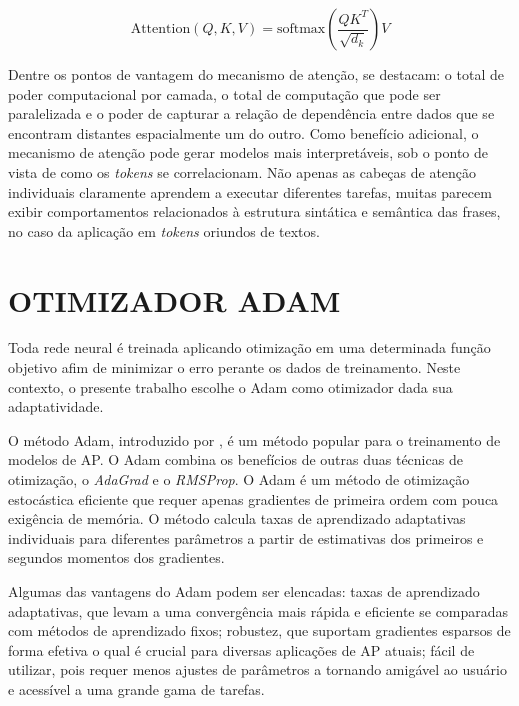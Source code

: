 \begin{equation}
\text{Attention}(Q, K, V) = \text{softmax}\left(\frac{QK^T}{\sqrt{d_k}}\right)V
\label{eq:attention}
\end{equation}

Dentre os pontos de vantagem do mecanismo de atenção, se destacam: o total de poder computacional por camada, o total de computação que pode ser paralelizada e o poder de capturar a relação de dependência entre dados que se encontram distantes espacialmente um do outro. Como benefício adicional, o mecanismo de atenção pode gerar modelos mais interpretáveis, sob o ponto de vista de como os \textit{tokens} se correlacionam. Não apenas as cabeças de atenção individuais claramente aprendem a executar diferentes tarefas, muitas parecem exibir comportamentos relacionados à estrutura sintática e semântica das frases, no caso da aplicação em \textit{tokens} oriundos de textos.

\section{OTIMIZADOR ADAM}
\label{sec:adam}

Toda rede neural é treinada aplicando otimização em uma determinada função objetivo afim de minimizar o erro perante os dados de treinamento. Neste contexto, o presente trabalho escolhe o \gls{Adam} como otimizador dada sua adaptatividade.

O método \gls{Adam}, introduzido por , é um método popular para o treinamento de modelos de \gls{AP}. O \gls{Adam} combina os benefícios de outras duas técnicas de otimização, o \textit{AdaGrad} e o \textit{RMSProp}. O \gls{Adam} é um método de otimização estocástica eficiente que requer apenas gradientes de primeira ordem com pouca exigência de memória. O método calcula taxas de aprendizado adaptativas individuais para diferentes parâmetros a partir de estimativas dos primeiros e segundos momentos dos gradientes.

Algumas das vantagens do \gls{Adam} podem ser elencadas: taxas de aprendizado adaptativas, que levam a uma convergência mais rápida e eficiente se comparadas com métodos de aprendizado fixos; robustez, que suportam gradientes esparsos de forma efetiva o qual é crucial para diversas aplicações de \gls{AP} atuais; fácil de utilizar, pois requer menos ajustes de parâmetros a tornando amigável ao usuário e acessível a uma grande gama de tarefas.


